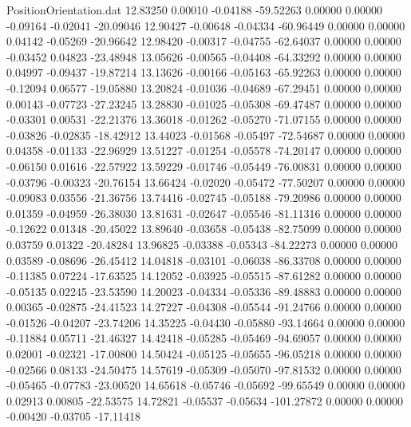 \begin{filecontents}{PositionOrientation.dat}
  12.83250    0.00010   -0.04188   -59.52263    0.00000    0.00000   -0.09164   -0.02041  -20.09046
  12.90427   -0.00648   -0.04334   -60.96449    0.00000    0.00000    0.04142   -0.05269  -20.96642
  12.98420   -0.00317   -0.04755   -62.64037    0.00000    0.00000   -0.03452    0.04823  -23.48948
  13.05626   -0.00565   -0.04408   -64.33292    0.00000    0.00000    0.04997   -0.09437  -19.87214
  13.13626   -0.00166   -0.05163   -65.92263    0.00000    0.00000   -0.12094    0.06577  -19.05880
  13.20824   -0.01036   -0.04689   -67.29451    0.00000    0.00000    0.00143   -0.07723  -27.23245
  13.28830   -0.01025   -0.05308   -69.47487    0.00000    0.00000   -0.03301    0.00531  -22.21376
  13.36018   -0.01262   -0.05270   -71.07155    0.00000    0.00000   -0.03826   -0.02835  -18.42912
  13.44023   -0.01568   -0.05497   -72.54687    0.00000    0.00000    0.04358   -0.01133  -22.96929
  13.51227   -0.01254   -0.05578   -74.20147    0.00000    0.00000   -0.06150    0.01616  -22.57922
  13.59229   -0.01746   -0.05449   -76.00831    0.00000    0.00000   -0.03796   -0.00323  -20.76154
  13.66424   -0.02020   -0.05472   -77.50207    0.00000    0.00000   -0.09083    0.03556  -21.36756
  13.74416   -0.02745   -0.05188   -79.20986    0.00000    0.00000    0.01359   -0.04959  -26.38030
  13.81631   -0.02647   -0.05546   -81.11316    0.00000    0.00000   -0.12622    0.01348  -20.45022
  13.89640   -0.03658   -0.05438   -82.75099    0.00000    0.00000    0.03759    0.01322  -20.48284
  13.96825   -0.03388   -0.05343   -84.22273    0.00000    0.00000    0.03589   -0.08696  -26.45412
  14.04818   -0.03101   -0.06038   -86.33708    0.00000    0.00000   -0.11385    0.07224  -17.63525
  14.12052   -0.03925   -0.05515   -87.61282    0.00000    0.00000   -0.05135    0.02245  -23.53590
  14.20023   -0.04334   -0.05336   -89.48883    0.00000    0.00000    0.00365   -0.02875  -24.41523
  14.27227   -0.04308   -0.05544   -91.24766    0.00000    0.00000   -0.01526   -0.04207  -23.74206
  14.35225   -0.04430   -0.05880   -93.14664    0.00000    0.00000   -0.11884    0.05711  -21.46327
  14.42418   -0.05285   -0.05469   -94.69057    0.00000    0.00000    0.02001   -0.02321  -17.00800
  14.50424   -0.05125   -0.05655   -96.05218    0.00000    0.00000   -0.02566    0.08133  -24.50475
  14.57619   -0.05309   -0.05070   -97.81532    0.00000    0.00000   -0.05465   -0.07783  -23.00520
  14.65618   -0.05746   -0.05692   -99.65549    0.00000    0.00000    0.02913    0.00805  -22.53575
  14.72821   -0.05537   -0.05634  -101.27872    0.00000    0.00000   -0.00420   -0.03705  -17.11418

\end{filecontents}
